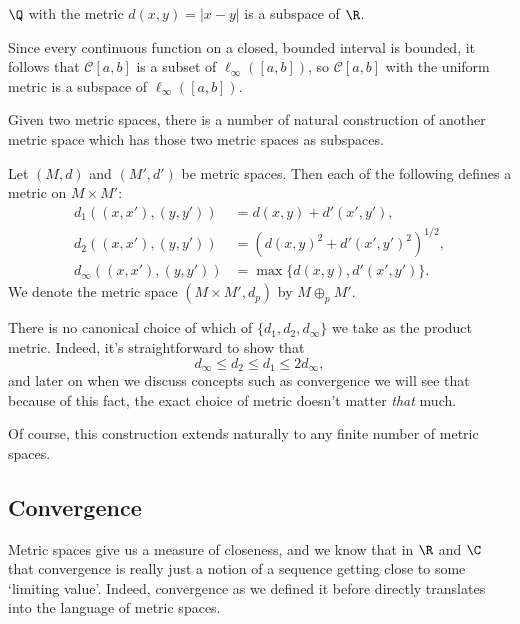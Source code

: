 \begin{example}[$\Q$ is a subspace of $\R$]
$\Q$ with the metric $d(x, y) = |x - y|$ is a subspace of $\R$.   
\end{example}

\begin{example}
    Since every continuous function on a closed, bounded interval is bounded, it follows that $\mathcal{C}[a, b]$ is a subset of $\ell_{\infty}([a, b])$, so $\mathcal{C}[a, b]$ with the uniform metric is a subspace of $\ell_{\infty}([a, b])$.
\end{example}

Given two metric spaces, there is a number of natural construction of another metric space which has those two metric spaces as subspaces.

\begin{definition}    
    Let $(M, d)$ and $(M', d')$ be metric spaces. Then each of the following defines a metric on $M \times M'$:
    \begin{align*}
        d_1((x, x'), (y, y')) &= d(x, y) + d'(x', y') ,\\
        d_2((x, x'), (y, y')) &= \left(d(x, y)^2 + d'(x', y')^2\right)^{1/2} ,\\
        d_{\infty}((x, x'), (y, y')) &= \max\{d(x, y), d'(x', y')\}.
    \end{align*}
    We denote the metric space $(M \times M', d_p)$ by $M \oplus_p M'$.
\end{definition}

\begin{remark}
    There is no canonical choice of which of $\{d_1, d_2, d_{\infty}\}$ we take as the product metric. Indeed, it's straightforward to show that
    $$
    d_{\infty} \leq d_2 \leq d_1 \leq 2 d_{\infty},
    $$
    and later on when we discuss concepts such as convergence we will see that because of this fact, the exact choice of metric doesn't matter \emph{that} much.
\end{remark}

Of course, this construction extends naturally to any finite number of metric spaces.

\subsection{Convergence}

Metric spaces give us a measure of closeness, and we know that in $\R$ and $\C$ that convergence is really just a notion of a sequence getting close to some `limiting value'. Indeed, convergence as we defined it before directly translates into the language of metric spaces.

